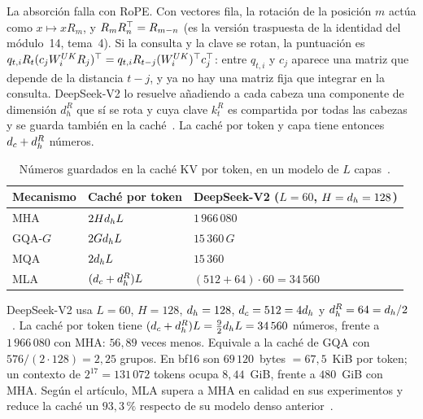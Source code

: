 \begin{observacion}
La absorción falla con RoPE. Con vectores fila, la rotación de la posición $m$ actúa como $x\mapsto xR_m$, y $R_mR_n^{\top}=R_{m-n}$ (es la versión traspuesta de la identidad del módulo~14, tema~4). Si la consulta y la clave se rotan, la puntuación es $q_{t,i}R_t(c_jW^{UK}_iR_j)^{\top}=q_{t,i}R_{t-j}(W^{UK}_i)^{\top} c_j^{\top}$: entre $q_{t,i}$ y $c_j$ aparece una matriz que depende de la distancia $t-j$, y ya no hay una matriz fija que integrar en la consulta. DeepSeek-V2 lo resuelve añadiendo a cada cabeza una componente de dimensión $d_h^{R}$ que sí se rota y cuya clave $k^{R}_t$ es compartida por todas las cabezas y se guarda también en la caché~\cite[§2.1.3]{deepseekv2}. La caché por token y capa tiene entonces $d_{c}+d_h^{R}$ números.
\end{observacion}

\begin{table}[ht]
\centering\small
\caption{Números guardados en la caché KV por token, en un modelo de $L$ capas~\cite[tabla~1]{deepseekv2}.}\label{tab:mla}
\begin{tabular}{@{}lll@{}}
\toprule
Mecanismo & Caché por token & DeepSeek-V2 ($L=60$, $H=d_{h}=128$) \\
\midrule
MHA & $2Hd_{h} L$ & $1\,966\,080$ \\
GQA-$G$ & $2Gd_{h} L$ & $15\,360\,G$ \\
MQA & $2d_{h} L$ & $15\,360$ \\
MLA & $(d_{c}+d_h^{R})L$ & $(512+64)\cdot 60=34\,560$ \\
\bottomrule
\end{tabular}
\end{table}

\begin{ejemplo}[DeepSeek-V2]\label{ej:mla}
DeepSeek-V2 usa $L=60$, $H=128$, $d_{h}=128$, $d_{c}=512=4d_{h}$ y $d_h^{R}=64=d_{h}/2$~\cite{deepseekv2}. La caché por token tiene $(d_{c}+d_h^{R})L=\frac92d_{h} L=34\,560$ números, frente a $1\,966\,080$ con MHA: $56{,}89$ veces menos. Equivale a la caché de GQA con $576/(2\cdot 128)=2{,}25$ grupos. En bf16 son $69\,120$~bytes $=67{,}5$~KiB por token; un contexto de $2^{17}=131\,072$ tokens ocupa $8{,}44$~GiB, frente a $480$~GiB con MHA. Según el artículo, MLA supera a MHA en calidad en sus experimentos y reduce la caché un $93{,}3\,\%$ respecto de su modelo denso anterior~\cite{deepseekv2}.
\end{ejemplo}

